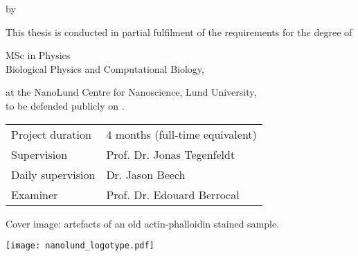 {
\pagestyle{empty}


\clearpage

\begin{titlepage}
	
	\frutigerfont
	
	\begin{center}

		
		{\Huge \garamondfont \thetitle}
		
		\smallskip
		by
		\bigskip
		
		{\Large \garamondfont \theauthor}
		
		\bigskip
		\bigskip
		
		This thesis is conducted in partial fulfilment of the requirements for the degree of 
		
		\bigskip
		
		{MSc in Physics} \\
		Biological Physics and Computational Biology,
		
		\bigskip
		
		at the NanoLund Centre for Nanoscience, Lund University,\\
		to be defended publicly on .
		
		
		\vspace{5cm}
		
		\vfill
		\begin{tabular}{ll}
			Project duration & 4 months (full-time equivalent)\\
			Supervision & Prof. Dr. Jonas Tegenfeldt\\
			Daily supervision & Dr. Jason Beech\\
			Examiner & Prof. Dr. Edouard Berrocal
		\end{tabular}
	
		\bigskip
	
		Cover image: artefacts of an old actin-phalloidin stained sample.
	
		\vspace{2cm}
		
		\texttt{[image: nanolund\_logotype.pdf]}
	
	
	\end{center}
\end{titlepage}

%
%
%
%
%
%
%
%

}